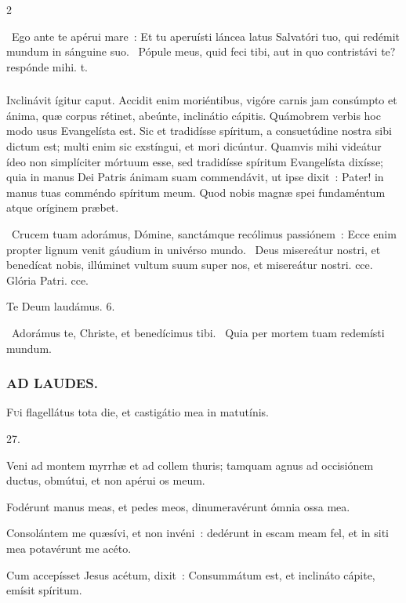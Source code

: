 \documentclass[9pt,twoside]{extarticle}
\begin{document}
\begin{multicols}{2}
{{{\begin{tightlist}{}
\item {}~Ego ante te apérui mare~: \textred{*} Et tu aperuísti láncea latus Salvatóri tuo, qui redémit mundum in sánguine suo. ~Pópule meus, quid feci tibi, aut in quo contristávi te? respónde mihi. t.
\end{tightlist}

\subsubsection*{\center{}}
\lettrine{I}nclinávit ígitur caput. Accidit enim moriéntibus, vigóre carnis jam consúmpto et ánima, quæ corpus rétinet, abeúnte, inclinátio cápitis. Quámobrem verbis hoc modo usus Evangelísta est. Sic et tradidísse spíritum, a consuetúdine nostra sibi dictum est; multi enim sic exstíngui, et mori dicúntur. Quamvis mihi videátur ídeo non simplíciter mórtuum esse, sed tradidísse spíritum Evangelísta dixísse; quia in manus Dei Patris ánimam suam commendávit, ut ipse dixit~: Pater! in manus tuas comméndo spíritum meum. Quod nobis magnæ spei fundaméntum atque oríginem præbet.

\begin{tightlist}{}
\item {}~Crucem tuam adorámus, Dómine, sanctámque recólimus passiónem~: \textred{*} Ecce enim propter lignum venit gáudium in univérso mundo. ~Deus misereátur nostri, et benedícat nobis, illúminet vultum suum super nos, et misereátur nostri. cce. Glória Patri. cce.
\item Te Deum laudámus. 6.
\item {}~Adorámus te, Christe, et benedícimus tibi. ~Quia per mortem tuam redemísti mundum.
\end{tightlist}

\subsubsection*{\center \textsc{AD LAUDES.}}
\begin{center}\end{center}
\lettrine{F}ui flagellátus tota die, et castigátio mea in matutínis.

\begin{tightlist}{}
\item {} 27. 
\item {} Veni ad montem myrrhæ et ad collem thuris; tamquam agnus ad occisiónem ductus, obmútui, et non apérui os meum.
\item {} Fodérunt manus meas, et pedes meos, dinumeravérunt ómnia ossa mea.
\item {} Consolántem me quæsívi, et non invéni~: dedérunt in escam meam fel, et in siti mea potavérunt me acéto.
\item {} Cum accepísset Jesus acétum, dixit~: Consummátum est, et inclináto cápite, emísit spíritum.
\end{tightlist}

}}}
\end{multicols}
\end{document}
